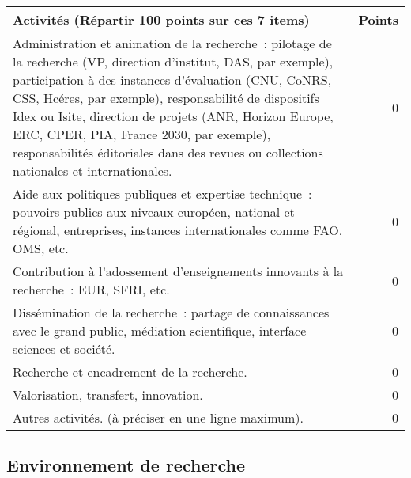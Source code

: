 \documentclass[]{article}
\begin{document}
\begin{tabular}{ |p{16cm}|r|  }
\hline
\rowcolor{gray!40}
Activités (Répartir 100 points sur ces 7 items) &  Points   \\
\hline
Administration et animation de la recherche : pilotage de la recherche (VP, direction d’institut, DAS, par exemple), participation à des instances d’évaluation (CNU, CoNRS, CSS, Hcéres, par exemple), responsabilité de dispositifs Idex ou Isite, direction de projets (ANR, Horizon Europe, ERC, CPER, PIA, France 2030, par exemple), responsabilités éditoriales dans des revues ou collections nationales et internationales. & 0 \\
\hline
Aide aux politiques publiques et expertise technique : pouvoirs publics aux niveaux européen, national et régional, entreprises, instances internationales comme FAO, OMS, etc. & 0 \\
\hline
Contribution à l’adossement d’enseignements innovants à la recherche : EUR, SFRI, etc. & 0 \\
Dissémination de la recherche : partage de connaissances avec le grand public, médiation scientifique, interface sciences et société. & 0 \\
\hline
Recherche et encadrement de la recherche. & 0 \\
\hline
Valorisation, transfert, innovation. & 0 \\
\hline
Autres activités. (à préciser en une ligne maximum). & 0 \\
\hline
\end{tabular}

\subsection{Environnement de recherche}

\end{document}
